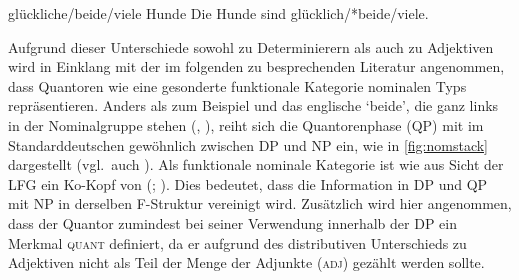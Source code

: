 \begin{exe}
\label{ex:beidedet}
\ex \begin{xlist}
		\label{ex:beidedet_1}
		\label{ex:beidedet_2}
		\label{ex:beidedet_3}
		\label{ex:beidedet_4}
\end{xlist}

\ex \begin{xlist}
	\ex glückliche/beide/viele Hunde
		\label{ex:beidepred_1}
	\ex Die Hunde sind glücklich/*beide/viele.
		\label{ex:beidepred_2}
\end{xlist}
\end{exe}

Aufgrund dieser Unterschiede sowohl zu  Determinierern als auch zu
Adjektiven wird in Einklang mit der im folgenden zu besprechenden Literatur
angenommen, dass Quantoren wie  eine gesonderte funktionale Kategorie
 nominalen Typs repräsentieren. Anders als zum Beispiel
 und das englische  `beide', die ganz links in der
Nominalgruppe stehen (, ), reiht sich die
Quantorenphase (QP) mit  im Standarddeutschen gewöhnlich zwischen DP
und NP ein, wie in \cref{fig:nomstack} dargestellt (vgl.~auch \cite[44--45 mit
Anm.~30]{lyons1999}). Als funktionale nominale Kategorie ist  wie
 aus Sicht der LFG ein Ko-Kopf von  (;
\cite[124]{bresnanetal2016}). Dies bedeutet, dass die Information in DP und QP
mit NP in derselben F-Struktur vereinigt wird. Zusätzlich wird hier angenommen,
dass der Quantor zumindest bei seiner Verwendung innerhalb der DP ein Merkmal
\textsc{quant} definiert, da er aufgrund des distributiven Unterschieds zu
Adjektiven nicht als Teil der Menge der Adjunkte (\textsc{adj}) gezählt werden
sollte.

